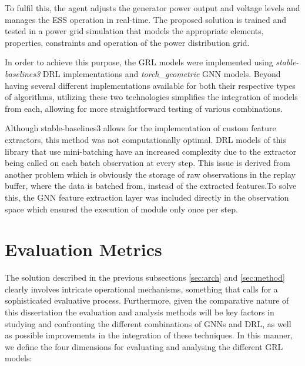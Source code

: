 To fulfil this, the agent adjusts the generator power output and voltage levels and manages the \ac{ESS} operation in real-time. The proposed solution is trained and tested in a power grid simulation that models the appropriate elements, properties, constraints and operation of the power distribution grid. \par
In order to achieve this purpose, the \ac{GRL} models were implemented using \textit{stable-baselines3} \ac{DRL} implementations and \textit{torch\_geometric} \ac{GNN} models. Beyond having several different implementations available for both their respective types of algorithms, utilizing these two technologies simplifies the integration of models from each, allowing for more straightforward testing of various combinations. \par
Although stable-baselines3 allows for the implementation of custom feature extractors, this method was not computationally optimal. \ac{DRL} models of this library that use mini-batching have an increased complexity due to the extractor being called on each batch observation at every step. This issue is derived from another problem which is obviously the storage of raw observations in the replay buffer, where the data is batched from, instead of the extracted features.To solve this, the \ac{GNN} feature extraction layer was included directly in the observation space which ensured the execution of module only once per step. \par



\section{Evaluation Metrics} \label{sec:eval-methods}

The solution described in the previous subsections \ref{sec:arch} and \ref{sec:method} clearly involves intricate operational mechanisms, something that calls for a sophisticated evaluative process. Furthermore, given the comparative nature of this dissertation the evaluation and analysis methods will be key factors in studying and confronting the different combinations of \acp{GNN} and \ac{DRL}, as well as possible improvements in the integration of these techniques.
In this manner, we define the four dimensions for evaluating and analysing the different \ac{GRL} models:

